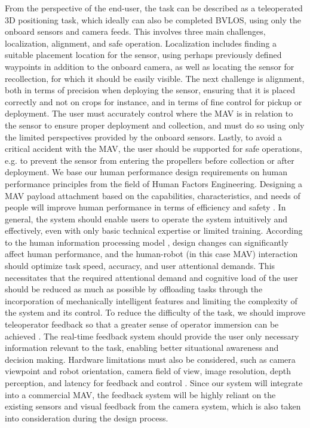From the perspective of the end-user, the task can be described as a teleoperated 3D positioning task, which ideally can also be completed \gls{BVLOS}, using only the onboard sensors and camera feeds.
%
This involves three main challenges, localization, alignment, and safe operation. 
Localization includes finding a suitable placement location for the sensor, using perhaps previously defined waypoints in addition to the onboard camera, as well as locating the sensor for recollection, for which it should be easily visible. 
The next challenge is alignment, both in terms of precision when deploying the sensor, ensuring that it is placed correctly and not on crops for instance, and in terms of fine control for pickup or deployment. The user must accurately control where the \gls{MAV} is in relation to the sensor to ensure proper deployment and collection, and must do so using only the limited perspectives provided by the onboard sensors. 
Lastly, to avoid a critical accident with the \gls{MAV}, the user should be supported for safe operations, e.g. to prevent the sensor from entering the propellers before collection or after deployment.
\newline
\indent We base our human performance design requirements on human performance principles from the field of Human Factors Engineering. Designing a \gls{MAV} payload attachment based on the capabilities, characteristics, and needs of people will improve human performance in terms of efficiency and safety \cite{Hobbs2016}. In general, the system should enable users to operate the system intuitively and effectively, even with only basic technical expertise or limited training. According to the human information processing model \cite{Wickens2021}, design changes can significantly affect human performance, and the human-robot (in this case MAV) interaction should optimize task speed, accuracy, and user attentional demands.
%
This necessitates that the required attentional demand and cognitive load of the user should be reduced as much as possible by offloading tasks through the incorporation of mechanically intelligent features and limiting the complexity of the system and its control. To reduce the difficulty of the task, we should improve teleoperator feedback \cite{Lathan2002} so that a greater sense of operator immersion can be achieved \cite{Burdea1996}. The real-time feedback system should provide the user only necessary information relevant to the task, enabling better situational awareness and decision making. Hardware limitations must also be considered, such as camera viewpoint and robot orientation, camera field of view, image resolution, depth perception, and latency for feedback and control \cite{Chen2007}. Since our system will integrate into a commercial \gls{MAV}, the feedback system will be highly reliant on the existing sensors and visual feedback from the camera system, which is also taken into consideration during the design process.

